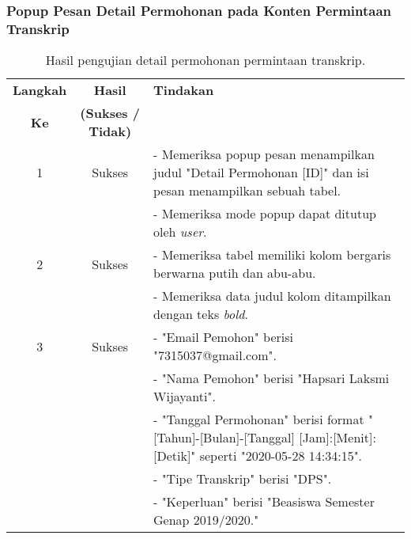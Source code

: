 \subsubsection{Popup Pesan Detail Permohonan pada Konten Permintaan Transkrip}
\begin{table}[H]
	\centering 
	\caption{Hasil pengujian detail permohonan permintaan transkrip.}
	\label{hasil:DetailPermintaanTranskrip}
	\begin{tabular}{|c| c| p{}|}
		\toprule
		\textbf{Langkah} & \textbf{Hasil} & \textbf{Tindakan}\\
		\textbf{Ke} & \textbf{(Sukses / Tidak)} &\\
		\midrule
		1&Sukses& - Memeriksa popup pesan menampilkan judul "Detail Permohonan [ID]" dan isi pesan menampilkan sebuah tabel.\\
		&& - Memeriksa mode popup dapat ditutup oleh \textit{user}.\\
		\hline
		2&Sukses&- Memeriksa tabel memiliki kolom bergaris berwarna putih dan abu-abu.\\
		&& - Memeriksa data judul kolom ditampilkan dengan teks \textit{bold}.	\\	
		\hline
		3&Sukses&- "Email Pemohon" berisi "7315037@gmail.com".\\
		&&- "Nama Pemohon" berisi "Hapsari Laksmi Wijayanti".\\
		&&- "Tanggal Permohonan" berisi format "[Tahun]-[Bulan]-[Tanggal] [Jam]:[Menit]:[Detik]" seperti "2020-05-28 14:34:15".\\
		&&- "Tipe Transkrip" berisi "DPS".\\
		&&- "Keperluan" berisi "Beasiswa Semester Genap 2019/2020."\\
		\bottomrule		
	\end{tabular} 
\end{table}

